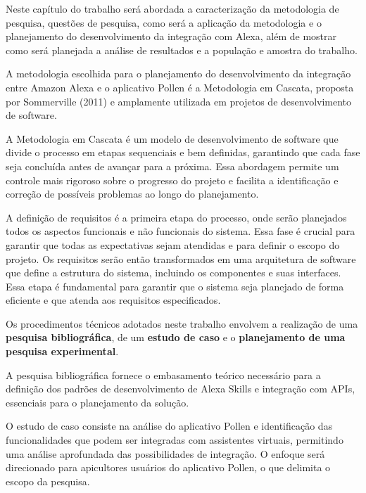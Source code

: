 \label{cap:procedimentos-metodologicos-tecnicos}

Neste capítulo do trabalho será abordada a caracterização da metodologia de pesquisa, questões de pesquisa,
como será a aplicação da metodologia e o planejamento do desenvolvimento da integração com Alexa, além de mostrar como será planejada a análise de resultados e a população e amostra do trabalho.

\label{sec:caracterizacao-metodologia-pesquisa}
    
A metodologia escolhida para o planejamento do desenvolvimento da integração entre Amazon Alexa e o aplicativo Pollen é a Metodologia em Cascata, 
proposta por Sommerville (2011) e amplamente utilizada em projetos de desenvolvimento de software.

A Metodologia em Cascata é um modelo de desenvolvimento de software que divide o processo em etapas sequenciais e bem definidas, 
garantindo que cada fase seja concluída antes de avançar para a próxima. Essa abordagem permite um controle mais rigoroso sobre o progresso do projeto e facilita a identificação e correção de possíveis problemas ao longo do planejamento.

A definição de requisitos é a primeira etapa do processo, onde serão planejados todos os aspectos funcionais e não funcionais do sistema. 
Essa fase é crucial para garantir que todas as expectativas sejam atendidas e para definir o escopo do projeto.
Os requisitos serão então transformados em uma arquitetura de software que define a estrutura do sistema, incluindo os componentes e suas interfaces. 
Essa etapa é fundamental para garantir que o sistema seja planejado de forma eficiente e que atenda aos requisitos especificados.

Os procedimentos técnicos adotados neste trabalho envolvem a realização de uma \textbf{pesquisa bibliográfica}, de um \textbf{estudo de caso} e o \textbf{planejamento de uma pesquisa experimental}.

A pesquisa bibliográfica fornece o embasamento teórico necessário para a definição dos padrões de desenvolvimento de Alexa Skills e integração com APIs, essenciais para o planejamento da solução.

O estudo de caso consiste na análise do aplicativo Pollen e identificação das funcionalidades que podem ser integradas com assistentes virtuais, permitindo uma análise aprofundada das possibilidades de integração. O enfoque será direcionado para apicultores usuários do aplicativo Pollen, o que delimita o escopo da pesquisa.

